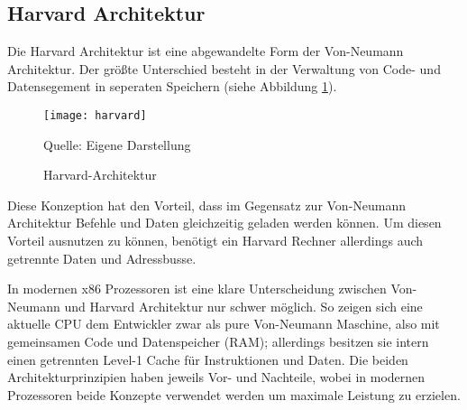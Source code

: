 \documentclass[12pt]{article}
\begin{document}
\subsection{Harvard Architektur} 
Die Harvard Architektur ist eine abgewandelte Form der Von-Neumann Architektur. Der größte Unterschied besteht in der Verwaltung von Code- und Datensegement in seperaten Speichern (siehe Abbildung \ref{fig:harvard}).

\begin{figure}[!htb]
\centering
\texttt{[image: harvard]}
\caption{Harvard-Architektur}
\centering
\small Quelle: Eigene Darstellung
\label{fig:harvard}
\end{figure}


\noindent Diese Konzeption hat den Vorteil, dass im Gegensatz zur Von-Neumann Architektur Befehle und Daten gleichzeitig geladen werden können. Um diesen Vorteil ausnutzen zu können, benötigt ein Harvard Rechner allerdings auch getrennte Daten und Adressbusse. 
\par\bigskip
\noindent In modernen x86 Prozessoren ist eine klare Unterscheidung zwischen Von-Neumann und Harvard Architektur nur schwer möglich. So zeigen sich eine aktuelle CPU dem Entwickler zwar als pure Von-Neumann Maschine, also mit gemeinsamen Code und Datenspeicher (RAM); allerdings besitzen sie intern einen getrennten Level-1 Cache für Instruktionen und Daten. Die beiden Architekturprinzipien haben jeweils Vor- und Nachteile, wobei in modernen Prozessoren beide Konzepte verwendet werden um maximale Leistung zu erzielen.
\end{document}
